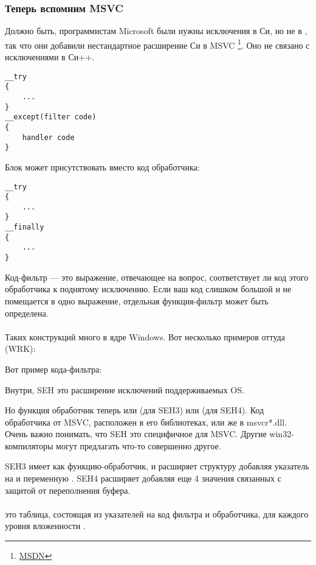 \subsubsection{Теперь вспомним MSVC}

Должно быть, программистам Microsoft были нужны исключения в Си, но не в \Cpp, так что они добавили нестандартное расширение Си в MSVC
\footnote{\href{http://go.yurichev.com/17057}{MSDN}}.
Оно не связано с исключениями в Си++.

\begin{lstlisting}
__try
{
    ...
}
__except(filter code)
{
    handler code
}
\end{lstlisting}

Блок  может присутствовать вместо код обработчика:

\begin{lstlisting}
__try
{
    ...
}
__finally
{
    ...
}
\end{lstlisting}

Код-фильтр --- это выражение, отвечающее на вопрос, соответствует ли код этого обработчика к поднятому исключению.
Если ваш код слишком большой и не помещается в одно выражение, отдельная функция-фильтр может быть определена.\\
\\
Таких конструкций много в ядре Windows.
Вот несколько примеров оттуда (\ac{WRK}):





Вот пример кода-фильтра:



Внутри, SEH это расширение исключений поддерживаемых OS.

Но функция обработчик теперь или  (для SEH3) или  (для SEH4).
Код обработчика от MSVC, расположен в его библиотеках, или же в  msvcr*.dll.
Очень важно понимать, что SEH это специфичное для MSVC.
Другие win32-компиляторы могут предлагать что-то совершенно другое.


SEH3 имеет  как функцию-обработчик, и расширяет структуру  добавляя указатель на 
и переменную .
SEH4 расширяет  добавляя еще 4 значения связанных с защитой от переполнения буфера.\\
\\
 это таблица, состоящая из указателей на код фильтра и обработчика, для каждого уровня вложенности .

